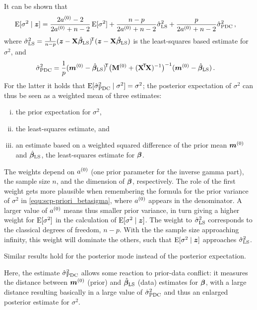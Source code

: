 It can be shown \parencite{1994:ohagan} that
\begin{align}
\operatorname{E}[\sigma^2\mid {\bm z}] &= \frac{2a^{(0)} - 2}{2a^{(0)} + n - 2} \operatorname{E}[\sigma^2]
                     + \frac{n - p}   {2a^{(0)} + n - 2} \hat{\sigma}^2_\text{LS}
                     + \frac{p}       {2a^{(0)} + n - 2} \hat{\sigma}^2_\text{PDC}\,,
\label{equ:scp-decomposition}
\end{align}
where $\hat{\sigma}^2_\text{LS} = \frac{1}{n-p} ({\bm z} - \mathbf{X}\hat{\boldsymbol{\beta}}_\text{LS})^{{\mbox{\!\scriptsize\textsf{T}}}} ({\bm z} - \mathbf{X}\hat{\boldsymbol{\beta}}_\text{LS})$ is
the least-squares based estimate for $\sigma^2$, and
\begin{align*}
\hat{\sigma}^2_\text{PDC} &= \frac{1}{p} ({\bm m}^{(0)} - \hat{\boldsymbol{\beta}}_\text{LS})^{{\mbox{\!\scriptsize\textsf{T}}}} \big(\mathbf{M}^{(0)} + (\mathbf{X}^{{\mbox{\!\scriptsize\textsf{T}}}} \! \mathbf{X})^{-1} \big)^{-1} ({\bm m}^{(0)} - \hat{\boldsymbol{\beta}}_\text{LS})\,.
\end{align*}
For the latter it holds that $\operatorname{E}[\hat{\sigma}^2_\text{PDC}\mid\sigma^2] = \sigma^2$;
the posterior expectation of $\sigma^2$ can thus be seen
as a weighted mean of three estimates:
\begin{enumerate}[(i)]
\item the prior expectation for $\sigma^2$,
\item the least-squares estimate, and
\item an estimate based on a weighted squared difference of the prior mean ${\bm m}^{(0)}$ and $\hat{\boldsymbol{\beta}}_\text{LS}$,
the least-squares estimate for $\boldsymbol{\beta}$.
\end{enumerate}
%
The weights depend on $a^{(0)}$ (one prior parameter for the inverse gamma part),
the sample size $n$, and the dimension of $\boldsymbol{\beta}$, respectively.
The role of the first weight gets more plausible when remembering the formula for the prior variance of $\sigma^2$
in \eqref{equ:scp-priori_betasigma}, where $a^{(0)}$ appears in the denominator. A larger value of $a^{(0)}$ means
thus smaller prior variance, in turn giving a higher weight for $\operatorname{E}[\sigma^2]$
in the calculation of $\operatorname{E}[\sigma^2\mid {\bm z}]$.
The weight to $\hat{\sigma}^2_\text{LS}$ corresponds to the classical degrees of freedom, $n-p$. With the
the sample size approaching infinity, this weight will dominate the others, such that
$\operatorname{E}[\sigma^2\mid {\bm z}]$ approaches $\hat{\sigma}^2_\text{LS}$.%

Similar results hold for the posterior mode instead of the posterior expectation.

Here, the estimate $\hat{\sigma}^2_\text{PDC}$ allows some reaction to prior-data conflict:
it measures the distance between ${\bm m}^{(0)}$ (prior) and $\hat{\boldsymbol{\beta}}_\text{LS}$ (data)
estimates for $\boldsymbol{\beta}$, with a large distance resulting basically in a large value of $\hat{\sigma}^2_\text{PDC}$
and thus an enlarged posterior estimate for $\sigma^2$.


